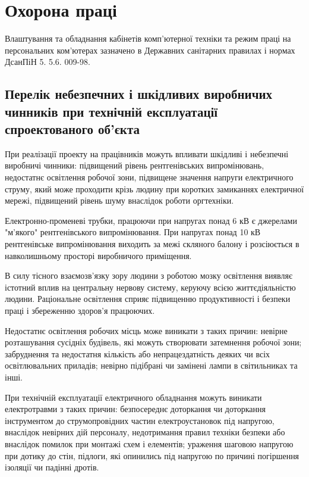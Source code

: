 \section{Охорона праці}

Влаштування та обладнання кабінетів комп’ютерної техніки та режим праці на персональних ком’ютерах зазначено в Державних санітарних правилах і нормах ДсанПіН 5. 5.6. 009-98.

\subsection{Перелік небезпечних і шкідливих виробничих чинників при
 технічній експлуатації спроектованого об'єкта}

При реалізації проекту на працівників можуть впливати шкідливі і небезпечні виробничі чинники: підвищений рівень рентгенівських випромінювань, недостатнє  освітлення робочої зони, підвищене значення напруги електричного струму, який може проходити крізь людину при коротких замиканнях електричної мережі, підвищений рівень шуму внаслідок роботи оргтехніки.

Електронно-променеві трубки, працюючи при напругах понад 6 кВ є джерелами "м'якого" рентгенівського випромінювання. При напругах понад  10 кВ рентгенівське випромінювання виходить за межі скляного балону і розсіюється в навколишньому просторі виробничого приміщення.

В силу тісного взаємозв'язку зору людини з роботою мозку освітлення виявляє істотний вплив на центральну нервову систему, керуючу всією життєдіяльністю людини. Раціональне освітлення сприяє підвищенню продуктивності і безпеки праці і збереженню здоров’я працюючих.

Недостатнє освітлення робочих місць може виникати з таких причин: невірне розташування сусідніх будівель, які можуть створювати затемнення робочої зони; забруднення та недостатня кількість або непрацездатність деяких чи всіх освітлювальних приладів; невірно підібрані чи замінені лампи в світильниках та інші.

При технічній експлуатації електричного обладнання  можуть виникати електротравми з таких причин: безпосереднє доторкання чи доторкання інструментом до струмопровідних частин електроустановок під напругою, внаслідок невірних дій персоналу, недотримання правил техніки безпеки або внаслідок помилок при монтажі схем і елементів; ураження шаговою напругою при дотику до стін, підлоги, які опинились під напругою по причині погіршення ізоляції чи падінні дротів.  

